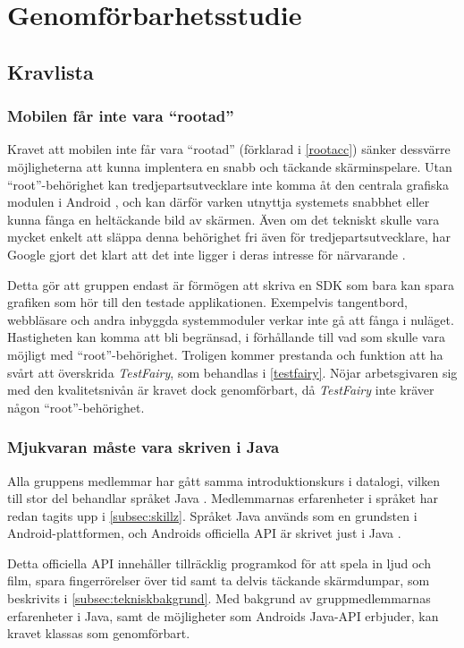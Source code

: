 \section{Genomförbarhetsstudie}
\subsection{Kravlista}
\subsubsection{Mobilen får inte vara ``rootad''}
Kravet att mobilen inte får vara ``rootad'' (förklarad i \ref{rootacc}) sänker dessvärre möjligheterna att kunna implentera en snabb och täckande skärminspelare. Utan ``root''-behörighet kan tredjepartsutvecklare inte komma åt den centrala grafiska modulen i Android \parencite{adoc}, och kan därför varken utnyttja systemets snabbhet eller kunna fånga en heltäckande bild av skärmen. Även om det tekniskt skulle vara mycket enkelt att släppa denna behörighet fri även för tredjepartsutvecklare, har Google gjort det klart att det inte ligger i deras intresse för närvarande \parencite{uhno}.

Detta gör att gruppen endast är förmögen att skriva en SDK som bara kan spara grafiken som hör till den testade applikationen. Exempelvis tangentbord, webbläsare och andra inbyggda systemmoduler verkar inte gå att fånga i nuläget. Hastigheten kan komma att bli begränsad, i förhållande till vad som skulle vara möjligt med ``root''-behörighet. Troligen kommer prestanda och funktion att ha svårt att överskrida \textit{TestFairy}, som behandlas i \ref{testfairy}. Nöjar arbetsgivaren sig med den kvalitetsnivån är kravet dock genomförbart, då \textit{TestFairy} inte kräver någon ``root''-behörighet.

\subsubsection{Mjukvaran måste vara skriven i Java}
Alla gruppens medlemmar har gått samma introduktionskurs i datalogi, vilken till stor del behandlar språket Java \parencite{inda}. Medlemmarnas erfarenheter i språket har redan tagits upp i \ref{subsec:skillz}. Språket Java används som en grundsten i Android-plattformen, och Androids officiella API är skrivet just i Java \parencite{adoc}. 

Detta officiella API innehåller tillräcklig programkod för att spela in ljud och film, spara fingerrörelser över tid samt ta delvis täckande skärmdumpar, som beskrivits i \ref{subsec:tekniskbakgrund}. Med bakgrund av gruppmedlemmarnas erfarenheter i Java, samt de möjligheter som Androids Java-API erbjuder, kan kravet klassas som genomförbart.


